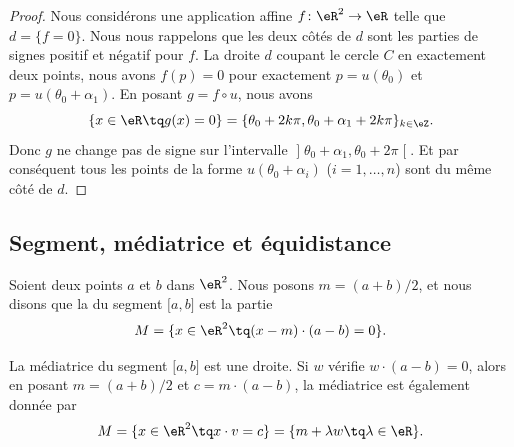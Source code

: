 \begin{proof}
	Nous considérons une application affine \(f \colon \eR^2\to \eR  \) telle que \( d=\{ f=0 \}\). Nous nous rappelons que les deux côtés de \( d\) sont les parties de signes positif et négatif pour \( f\). La droite \( d\) coupant le cercle \( C\) en exactement deux points, nous avons \( f(p)=0\) pour exactement \( p=u(\theta_0)\) et \( p=u(\theta_0+\alpha_1)\). En posant \( g=f\circ u\), nous avons
	\begin{equation}
		\{ x\in \eR\tq g(x)=0 \}=\{ \theta_0+2k\pi,\theta_0+\alpha_1+2k\pi \}_{k\in \eZ}.
	\end{equation}
	Donc \( g\) ne change pas de signe sur l'intervalle \( \mathopen] \theta_0+\alpha_1,\theta_0+2\pi\mathclose[\). Et par conséquent tous les points de la forme \( u(\theta_0+\alpha_i)\) (\( i=1,\ldots,n\)) sont du même côté de \( d\).
\end{proof}


\subsection{Segment, médiatrice et équidistance}

\begin{definition}	\label{DEFooDLBFooYmJPhQ}
	Soient deux points \( a\) et \( b\) dans \( \eR^2\). Nous posons \( m=(a+b)/2\), et nous disons que la  du segment \( \mathopen[a,b\mathclose]\) est la partie
	\begin{equation}		\label{EQooTOACooUQjNJa}
		M=\{ x\in \eR^2\tq (x-m)\cdot (a-b)=0 \}.
	\end{equation}
\end{definition}

\begin{proposition}	\label{PROPooPOKCooMoEfOB}
	La médiatrice du segment \( \mathopen[ a,b\mathclose]\) est une droite. Si \( w\) vérifie \( w\cdot (a-b)=0\), alors en posant \( m=(a+b)/2\) et \( c=m\cdot(a-b)\), la médiatrice est  également donnée par
	\begin{equation}		\label{EQooYJKWooIMBdjO}
		M=\{ x\in \eR^2\tq x\cdot v=c \}=\{ m+\lambda w\tq \lambda\in \eR \}.
	\end{equation}
\end{proposition}

